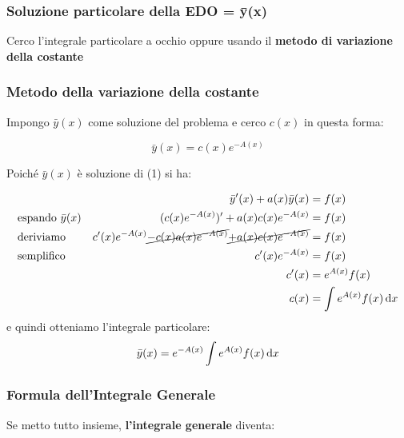 \pagebreak
\subsubsection{Soluzione particolare della EDO = ȳ(x)}

Cerco l'integrale particolare a occhio oppure usando il \textbf{metodo di variazione della costante}

\subsubsection*{Metodo della variazione della costante}

Impongo \(\bar y(x)\) come soluzione del problema e cerco \(c(x)\) in questa forma:

\[
    \bar y(x) = c(x) e ^{-A(x)}
\]

Poiché \(\bar y(x)\) è soluzione di (1) si ha:

\begin{align*}
     &                            & \bar y'(x)+a(x) \bar y(x)                                                        & = f(x)                        \\
     & \text{espando}\ \bar{y}(x) & (c(x) e ^{-A(x)})'+ a(x) c(x) e ^{-A(x)}                                         & = f(x)                        \\
     & \text{deriviamo}           & c'(x) e ^{-A(x)} \cancel{- c(x) a(x) e ^{-A(x)}} \cancel{+ a(x) c(x) e ^{-A(x)}} & = f(x)                        \\
     & \text{semplifico}          & c'(x) e ^{-A(x)}                                                                 & = f(x)                        \\
     &                            & c'(x)                                                                            & = e ^{A(x)} f(x)              \\
     &                            & c(x)                                                                             & = \int e ^{A(x)} f(x) \mathop{}\!\mathrm{d} x
\end{align*}
e quindi otteniamo l'integrale particolare:
\[
    \bar y(x) = e ^{-A(x)} \int e^{A(x)} f(x) \mathop{}\!\mathrm{d} x
\]

\pagebreak
\subsubsection{Formula dell'Integrale Generale}

Se metto tutto insieme, \textbf{l'integrale generale} diventa:

